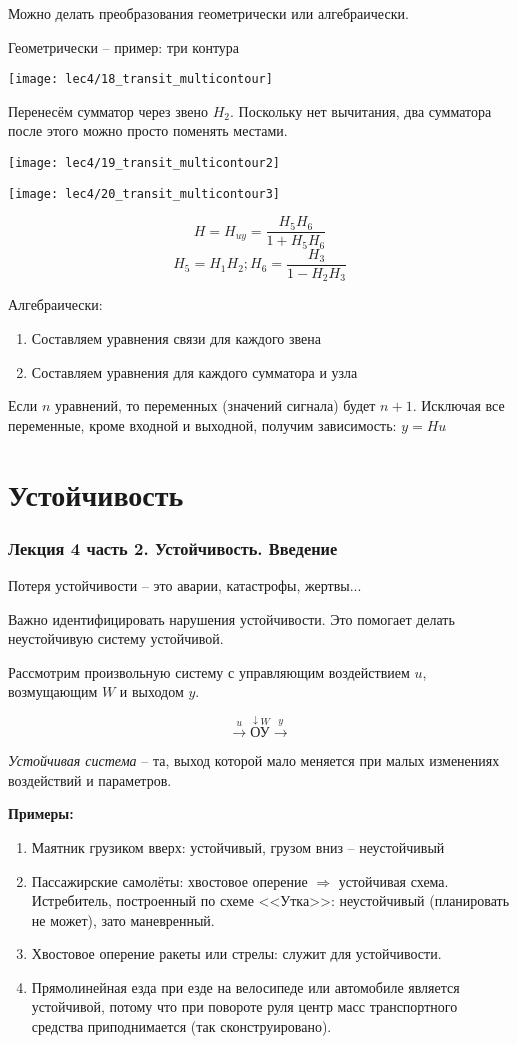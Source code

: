 \documentclass[main.tex]{subfiles}
\begin{document}
Можно делать преобразования геометрически или алгебраически.

Геометрически -- пример: три контура

\texttt{[image: lec4/18\_transit\_multicontour]}

Перенесём сумматор через звено $ H_2 $.
Поскольку нет вычитания, два сумматора после этого можно просто поменять местами.

\texttt{[image: lec4/19\_transit\_multicontour2]}

\texttt{[image: lec4/20\_transit\_multicontour3]}

$$ H = H_{uy} = \frac{H_5 H_6}{1 + H_5 H_6} $$
$$ H_5 = H_1 H_2; H_6 = \frac{H_3}{1 - H_2 H_3} $$

Алгебраически:
\begin{enumerate}[noitemsep]
    \item Составляем уравнения связи для каждого звена
    \item Составляем уравнения для каждого сумматора и узла
\end{enumerate}

Если $ n $ уравнений, то переменных (значений сигнала) будет $ n + 1 $.
Исключая все переменные, кроме входной и выходной, получим зависимость: $ y = Hu $


\chapter{Устойчивость}

\subsection{Лекция 4 часть 2. Устойчивость. Введение}

Потеря устойчивости -- это аварии, катастрофы, жертвы...

Важно идентифицировать нарушения устойчивости.
Это помогает делать неустойчивую систему устойчивой.

Рассмотрим произвольную систему с управляющим воздействием $u$, возмущающим $W$ и выходом $y$.

$$ \xrightarrow{u} \overset{\downarrow W}{\boxed{\text{ОУ}}} \xrightarrow{y} $$

\emph{Устойчивая система} -- та, выход которой мало меняется при малых изменениях воздействий и параметров.

\textbf{Примеры:}
\begin{enumerate}
    \item Маятник грузиком вверх: устойчивый, грузом вниз -- неустойчивый
    \item Пассажирские самолёты: хвостовое оперение $ \Rightarrow $ устойчивая схема.
    Истребитель, построенный по схеме <<Утка>>: неустойчивый (планировать не может), зато маневренный.
    \item Хвостовое оперение ракеты или стрелы: служит для устойчивости.
    \item Прямолинейная езда при езде на велосипеде или автомобиле является устойчивой, потому что при повороте руля центр масс транспортного средства приподнимается (так сконструировано).
\end{enumerate}
\end{document}
